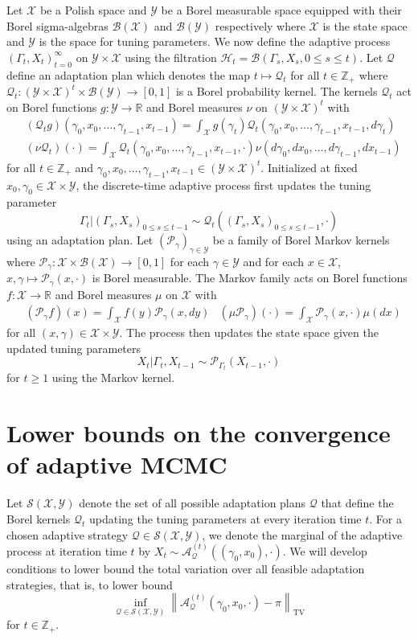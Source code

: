 \documentclass[12pt]{article}
\theoremstyle{plain}
\theoremstyle{remark}
\newcommand{\norm}[1]{\left\lVert#1\right\rVert}
\newcommand{\R}{\mathbb{R}}
\newcommand{\Z}{\mathbb{Z}}
\newcommand{\Q}{\mathcal{Q}}
\renewcommand{\P}{\mathcal{P}}
\newcommand{\A}{\mathcal{A}}
\renewcommand{\H}{\mathcal{H}}
\newcommand{\X}{\mathcal{X}}
\newcommand{\Y}{\mathcal{Y}}
\newcommand{\B}{\mathcal{B}}
\renewcommand{\S}{\mathcal{S}}
\newcommand{\eq}[1]{\begin{align*}#1\end{align*}}
\begin{document}
Let $\X$ be a Polish space and $\Y$ be a Borel measurable space equipped with their Borel sigma-algebras $\B(\X)$ and $\B(\Y)$ respectively where $\X$ is the state space and $\Y$ is the space for tuning parameters.
We now define the adaptive process $(\Gamma_t, X_t)_{t = 0}^\infty$ on $\Y \times \X$ using the filtration $\H_t = \B( \Gamma_s, X_s, 0 \le s \le t )$.
Let $\Q$ define an adaptation plan which denotes the map $t \mapsto \Q_t$ for all $t \in \Z_+$ where $\Q_t : (\Y \times \X)^{t} \times \B(\Y) \to [0, 1]$ is a Borel probability kernel.
The kernels $\Q_t$ act on Borel functions $g : \Y \to \R$ and Borel measures $\nu$ on $(\Y \times \X)^{t}$ with 
\eq{
&(\Q_t g)(\gamma_0, x_0, \ldots, \gamma_{t-1}, x_{t-1}) = \int_{\X} g(\gamma_t) \Q_t( \gamma_0, x_0, \ldots, \gamma_{t-1}, x_{t-1}, d\gamma_t )
\\
&(\nu \Q_t)(\cdot) = \int_{\X} \Q_t(\gamma_0, x_0, \ldots, \gamma_{t-1}, x_{t-1}, \cdot) \nu(d\gamma_0, dx_0, \ldots, d\gamma_{t-1}, dx_{t-1})
}
for all $t \in \Z_+$ and $\gamma_0, x_0, \ldots, \gamma_{t-1}, x_{t-1} \in (\Y \times \X)^t$.
Initialized at fixed $x_0, \gamma_0 \in \X \times \Y$, the discrete-time adaptive process first updates the tuning parameter 
\[
\Gamma_t | ( \Gamma_s, X_s )_{0 \le s \le t-1} \sim \Q_t(( \Gamma_s, X_s )_{0 \le s \le t-1}, \cdot)
\]
using an adaptation plan.
Let $(\P_\gamma)_{\gamma \in \Y}$ be a family of Borel Markov kernels where $\P_\gamma : \X \times \B(\X) \to [0, 1]$ for each $\gamma \in \Y$ and for each $x \in \X$, $x, \gamma \mapsto \P_\gamma(x, \cdot)$ is Borel measurable.
The Markov family acts on Borel functions $f : \X \to \R$ and Borel measures $\mu$ on $\X$ with 
\eq{
&(\P_\gamma f)(x) = \int_{\X} f(y) \P_\gamma(x, dy)
&(\mu \P_\gamma)(\cdot) = \int_{\X} \P_\gamma(x, \cdot) \mu(dx)
}
for all $(x, \gamma) \in \X \times \Y$.
The process then updates the state space given the updated tuning parameters 
\[
X_t | \Gamma_{t}, X_{t - 1} \sim \P_{\Gamma_{t}}(X_{t-1}, \cdot)
\]
for $t \ge 1$ using the Markov kernel.

\section{Lower bounds on the convergence of adaptive MCMC}
\label{section:lower_bounds}

Let $\S(\X, \Y)$ denote the set of all possible adaptation plans $\Q$ that define the Borel kernels $\Q_t$ updating the tuning parameters at every iteration time $t$.
For a chosen adaptive strategy $\Q \in \S(\X, \Y)$, we denote the marginal of the adaptive process at iteration time $t$ by $X_t \sim \A_\Q^{(t)}((\gamma_0, x_0), \cdot)$.
We will develop conditions to lower bound the total variation over all feasible adaptation strategies, that is, to lower bound
\[
\inf_{\Q \in \S(\X, \Y) } \norm{ \A_\Q^{(t)}(\gamma_0, x_0, \cdot) - \pi }_{\text{TV}}
\]
for $t \in \Z_+$.
\end{document}
